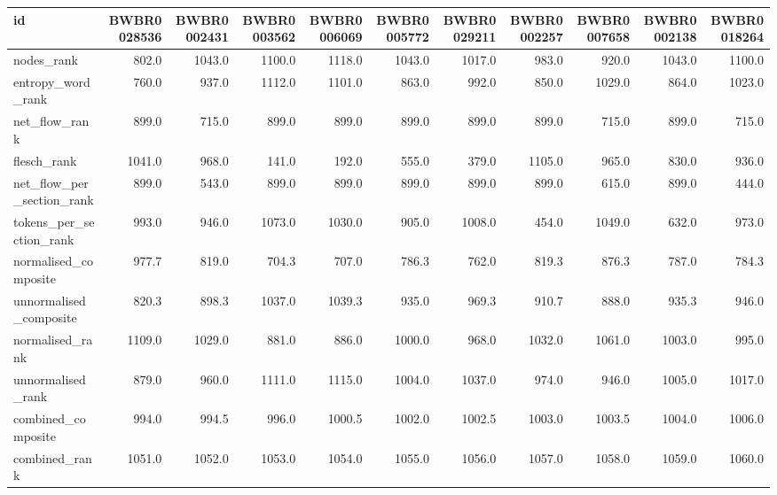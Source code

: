 \begin{tabular}{lrrrrrrrrrr}
\toprule
id & BWBR0028536 & BWBR0002431 & BWBR0003562 & BWBR0006069 & BWBR0005772 & BWBR0029211 & BWBR0002257 & BWBR0007658 & BWBR0002138 & BWBR0018264 \\
\midrule
nodes\_rank & 802.0 & 1043.0 & 1100.0 & 1118.0 & 1043.0 & 1017.0 & 983.0 & 920.0 & 1043.0 & 1100.0 \\
\cline{1-11}
entropy\_word\_rank & 760.0 & 937.0 & 1112.0 & 1101.0 & 863.0 & 992.0 & 850.0 & 1029.0 & 864.0 & 1023.0 \\
\cline{1-11}
net\_flow\_rank & 899.0 & 715.0 & 899.0 & 899.0 & 899.0 & 899.0 & 899.0 & 715.0 & 899.0 & 715.0 \\
\cline{1-11}
flesch\_rank & 1041.0 & 968.0 & 141.0 & 192.0 & 555.0 & 379.0 & 1105.0 & 965.0 & 830.0 & 936.0 \\
\cline{1-11}
net\_flow\_per\_section\_rank & 899.0 & 543.0 & 899.0 & 899.0 & 899.0 & 899.0 & 899.0 & 615.0 & 899.0 & 444.0 \\
\cline{1-11}
tokens\_per\_section\_rank & 993.0 & 946.0 & 1073.0 & 1030.0 & 905.0 & 1008.0 & 454.0 & 1049.0 & 632.0 & 973.0 \\
\cline{1-11}
normalised\_composite & 977.7 & 819.0 & 704.3 & 707.0 & 786.3 & 762.0 & 819.3 & 876.3 & 787.0 & 784.3 \\
\cline{1-11}
unnormalised\_composite & 820.3 & 898.3 & 1037.0 & 1039.3 & 935.0 & 969.3 & 910.7 & 888.0 & 935.3 & 946.0 \\
\cline{1-11}
normalised\_rank & 1109.0 & 1029.0 & 881.0 & 886.0 & 1000.0 & 968.0 & 1032.0 & 1061.0 & 1003.0 & 995.0 \\
\cline{1-11}
unnormalised\_rank & 879.0 & 960.0 & 1111.0 & 1115.0 & 1004.0 & 1037.0 & 974.0 & 946.0 & 1005.0 & 1017.0 \\
\cline{1-11}
combined\_composite & 994.0 & 994.5 & 996.0 & 1000.5 & 1002.0 & 1002.5 & 1003.0 & 1003.5 & 1004.0 & 1006.0 \\
\cline{1-11}
combined\_rank & 1051.0 & 1052.0 & 1053.0 & 1054.0 & 1055.0 & 1056.0 & 1057.0 & 1058.0 & 1059.0 & 1060.0 \\
\cline{1-11}
\bottomrule
\end{tabular}

